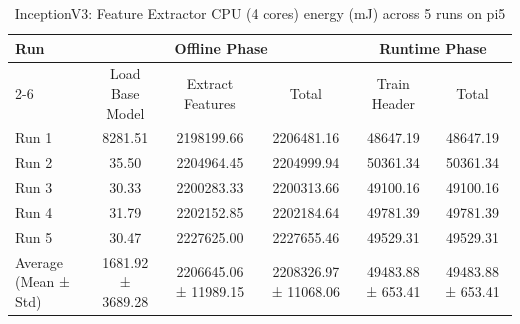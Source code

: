 \begin{table}[t]
\centering
\caption{InceptionV3: Feature Extractor CPU (4 cores) energy (mJ) across 5 runs on pi5}
\label{tab:energy_inceptionv3_CPU4_pi5}
\begin{tabular}{lccccc}
\hline
\multirow{2}{*}{Run} & \multicolumn{3}{c}{Offline Phase} & \multicolumn{2}{c}{Runtime Phase} \\
\cline{2-6}
 & Load Base Model & Extract Features & Total & Train Header & Total \\
\hline
  Run 1                  & 8281.51        & 2198199.66     & 2206481.16     & 48647.19       & 48647.19       \\
  Run 2                  & 35.50          & 2204964.45     & 2204999.94     & 50361.34       & 50361.34       \\
  Run 3                  & 30.33          & 2200283.33     & 2200313.66     & 49100.16       & 49100.16       \\
  Run 4                  & 31.79          & 2202152.85     & 2202184.64     & 49781.39       & 49781.39       \\
  Run 5                  & 30.47          & 2227625.00     & 2227655.46     & 49529.31       & 49529.31       \\
\hline
  Average (Mean ± Std)   & 1681.92 ± 3689.28 & 2206645.06 ± 11989.15 & 2208326.97 ± 11068.06 & 49483.88 ± 653.41 & 49483.88 ± 653.41 \\
\hline
\end{tabular}
\end{table}
